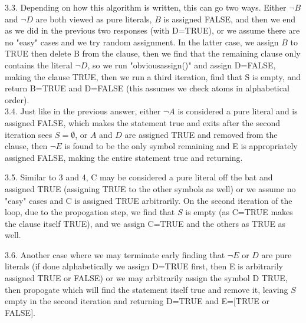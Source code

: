 \documentclass{article}
\begin{document}
\begin{enumerate}
		3.3. Depending on how this algorithm is written, this can go two ways.  Either $\neg B$ and $\neg D$ are both viewed as pure literals, $B$ is assigned FALSE, and then we end as we did in the previous two responses (with D=TRUE), or we assume there are no "easy" cases and we try random assignment.  In the latter case, we assign $B$ to TRUE then delete B from the clause, then we find that the remaining clause only contains the literal $\neg D$, so we run "obviousassign()" and assign D=FALSE, making the clause TRUE, then we run a third iteration, find that S is empty, and return B=TRUE and D=FALSE (this assumes we check atoms in alphabetical order).\\
		
		3.4. Just like in the previous answer, either $\neg A$ is considered a pure literal and is assigned FALSE, which makes the statement true and exits after the second iteration sees $S = \emptyset$, or $A$ and $D$ are assigned TRUE and removed from the clause, then $\neg E$ is found to be the only symbol remaining and E is appropriately assigned FALSE, making the entire statement true and returning.
		
		3.5. Similar to 3 and 4, C may be considered a pure literal off the bat and assigned TRUE (assigning TRUE to the other symbols as well) or we assume no "easy" cases and C is assigned TRUE arbitrarily.  On the second iteration of the loop, due to the propogation step, we find that $S$ is empty (as C=TRUE makes the clause itself TRUE), and we assign C=TRUE and the others as TRUE as well.
		
		3.6. Another case where we may terminate early finding that $\neg E$ or $D$ are pure literals (if done alphabetically we assign D=TRUE first, then E is arbitrarily assigned TRUE or FALSE) or we may arbitrarily assign the symbol D TRUE, then propogate which will find the statement itself true and remove it, leaving $S$ empty in the second iteration and returning D=TRUE and E=[TRUE or FALSE].
	\end{enumerate}
	
\end{document}
